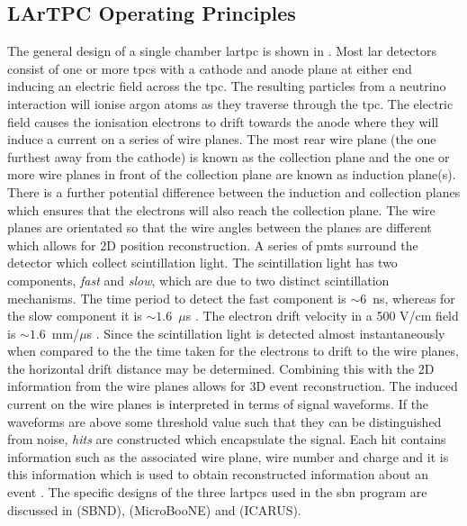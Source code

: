 \subsection{LArTPC Operating Principles}
The general design of a single chamber \gls{lartpc} is shown in . Most \gls{lar} detectors consist of one or more \glspl{tpc} with a cathode and anode plane at either end inducing an electric field across the \gls{tpc}. The resulting particles from a neutrino interaction will ionise argon atoms as they traverse through the \gls{tpc}. The electric field causes the ionisation electrons to drift towards the anode where they will induce a current on a series of wire planes. The most rear wire plane (the one furthest away from the cathode) is known as the collection plane and the one or more wire planes in front of the collection plane are known as induction plane(s). There is a further potential difference between the induction and collection planes which ensures that the electrons will also reach the collection plane. The wire planes are orientated so that the wire angles between the planes are different which allows for 2D position reconstruction. A series of \glspl{pmt} surround the detector which collect scintillation light. The scintillation light has two components, \textit{fast} and \textit{slow}, which are due to two distinct scintillation mechanisms. The time period to detect the fast component is \mbox{$\sim6$ ns}, whereas for the slow component it is \mbox{$\sim1.6$ $\mu$s} \cite{SBN_Proposal}. The electron drift velocity in a 500 V/cm field is \mbox{$\sim1.6$ mm/$\mu$s} \cite{electron_drift_velocity}. Since the scintillation light is detected almost instantaneously when compared to the the time taken for the electrons to drift to the wire planes, the horizontal drift distance may be determined. Combining this with the 2D information from the wire planes allows for 3D event reconstruction. The induced current on the wire planes is interpreted in terms of signal waveforms. If the waveforms are above some threshold value such that they can be distinguished from noise, \textit{hits} are constructed which encapsulate the signal. Each hit contains information such as the associated wire plane, wire number and charge and it is this information which is used to obtain reconstructed information about an event \cite{Design_and_Construction_of_the_MicroBooNE_Detector}. The specific designs of the three \glspl{lartpc} used in the \gls{sbn} program are discussed in  (SBND),  (MicroBooNE) and  (ICARUS).

